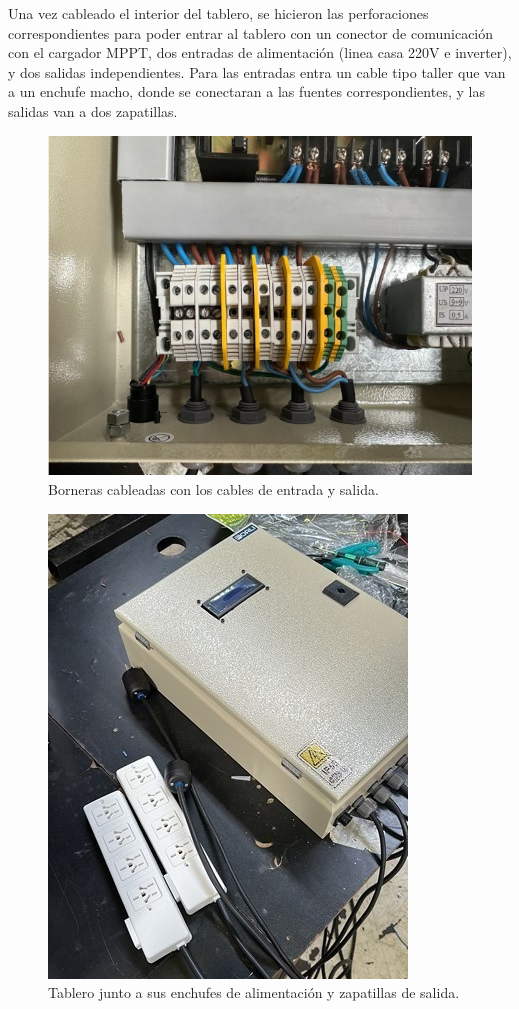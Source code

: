 Una vez cableado el interior del tablero, se hicieron las perforaciones correspondientes para poder entrar al tablero con un conector de comunicación con el cargador MPPT, dos entradas de alimentación (linea casa 220V e inverter), y dos salidas independientes. Para las entradas entra un cable tipo taller que van a un enchufe macho, donde se conectaran a las fuentes correspondientes, y las salidas van a dos zapatillas.\\

\begin{figure}[H]
    \centering
    \includegraphics[width=0.6\linewidth]{informes/Screenshot_30.jpg}
    \caption{Borneras cableadas con los cables de entrada y salida.}
\end{figure}

\begin{figure}[H]
    \centering
    \includegraphics[width=0.6\linewidth]{informes/58F0F50C-2961-4AB2-A5AF-3BB59FF31CC9.jpg}
    \caption{Tablero junto a sus enchufes de alimentación y zapatillas de salida.}
\end{figure}

